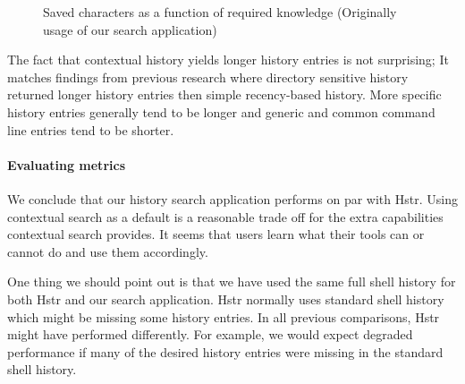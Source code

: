 \begin{figure}[h!]
\centering
{}
\caption{Saved characters as a function of required knowledge (Originally usage of our search application)}
\label{eval-metrics-plot-chars-resh}
\end{figure}



The fact that contextual history yields longer history entries is not surprising; It matches findings from previous research\cite{greenberg1993computer} where directory sensitive history returned longer history entries then simple recency-based history. More specific history entries generally tend to be longer and generic and common command line entries tend to be shorter. 

\paragraph{Evaluating metrics}

We conclude that our history search application performs on par with Hstr. Using contextual search as a default is a reasonable trade off for the extra capabilities contextual search provides. It seems that users learn what their tools can or cannot do and use them accordingly.


One thing we should point out is that we have used the same full shell history for both Hstr and our search application. Hstr normally uses standard shell history which might be missing some history entries.
In all previous comparisons, Hstr might have performed differently. For example, we would expect degraded performance if many of the desired history entries were missing in the standard shell history.



